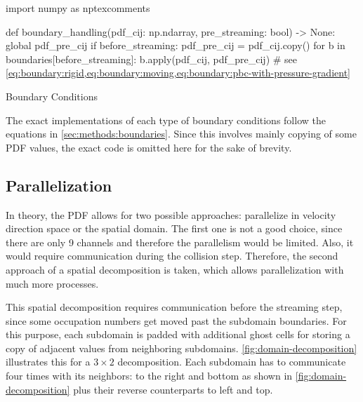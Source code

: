\begin{listing}[ht!]
    \def\bdryref{\cref{eq:boundary:rigid,eq:boundary:moving,eq:boundary:pbc-with-pressure-gradient}}
    \begin{pycode}
        import numpy as nptexcomments

        def boundary_handling(pdf_cij: np.ndarray, pre_streaming: bool) -> None:
            global pdf_pre_cij
            if before_streaming:
                pdf_pre_cij = pdf_cij.copy()
            for b in boundaries[before_streaming]:
                b.apply(pdf_cij, pdf_pre_cij)  # see \bdryref
    \end{pycode}
    \caption{Boundary Conditions}
    \label{code:boundaries}
\end{listing}

The exact implementations of each type of boundary conditions follow the equations in \cref{sec:methods:boundaries}. Since this involves mainly copying of some \gls{PDF} values, the exact code is omitted here for the sake of brevity.

\subsection{Parallelization}
\label{sec:implementation:parallelization}

In theory, the \gls{PDF} allows for two possible approaches: parallelize in velocity direction space or the spatial domain. The first one is not a good choice, since there are only 9 channels and therefore the parallelism would be limited. Also, it would require communication during the collision step. Therefore, the second approach of a spatial decomposition is taken, which allows parallelization with much more processes.

This spatial decomposition requires communication before the streaming step, since some occupation numbers get moved past the subdomain boundaries. For this purpose, each subdomain is padded with additional ghost cells for storing a copy of adjacent values from neighboring subdomains. \cref{fig:domain-decomposition} illustrates this for a $3\times2$ decomposition. Each subdomain has to communicate four times with its neighbors: to the right and bottom as shown in \cref{fig:domain-decomposition} plus their reverse counterparts to left and top.

